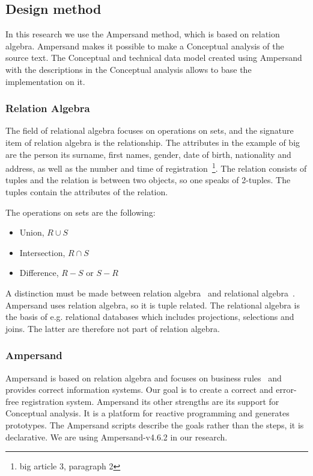 \subsection{Design method} \label{design_method}
In this research we use the Ampersand method, which is based on relation algebra.
Ampersand makes it possible to make a Conceptual analysis of the source text.
The Conceptual and technical data model created using Ampersand with the descriptions in the Conceptual analysis allows to base the implementation on it.

\subsubsection{Relation Algebra} \label{relation_algebra}
The field of relational algebra focuses on operations on sets, and the signature item of relation algebra is the relationship.
The attributes in the example of \acrshort{big} are the person its surname, first names, gender, date of birth, nationality and address, as well as the number and time of registration~\footnote{\acrlong{big} article 3, paragraph 2 }.
The relation consists of tuples and the relation is between two objects, so one speaks of 2-tuples.
The tuples contain the attributes of the relation.

\begin{samepage}The operations on sets are the following:
\begin{itemize}
    \item Union, $R \cup S$ %
    \item Intersection, $R \cap S$ %
    \item Difference, $R - S$ or $S - R$ %
\end{itemize}
\end{samepage}
A distinction must be made between relation algebra~\citep{maddux_bibliography_2006} and relational algebra~\citep{codd_relational_1970}.
Ampersand uses relation algebra, so it is tuple related.
The relational algebra is the basis of e.g. relational databases which includes projections, selections and joins.
The latter are therefore not part of relation algebra.


\subsubsection{Ampersand} \label{ampersand}
Ampersand is based on relation algebra and focuses on business rules~ and provides correct information systems.
Our goal is to create a correct and error-free registration system.
Ampersand its other strengths are its support for Conceptual analysis.
It is a platform for reactive programming and generates prototypes.
The Ampersand scripts describe the goals rather than the steps, it is declarative.
We are using Ampersand-v4.6.2 in our research.

